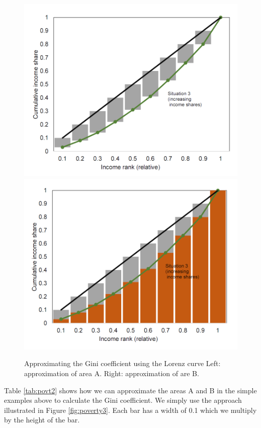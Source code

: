 \documentclass[]{book}
\begin{document}
\begin{figure}

{\centering \includegraphics[width=0.48\linewidth]{_resources/chapter_inequality/ex6_4} \includegraphics[width=0.48\linewidth]{_resources/chapter_inequality/ex6_5} 

}

\caption{Approximating the Gini coefficient using the Lorenz curve Left: approximation of area A. Right: approximation of are B.}\label{fig:poverty2}
\end{figure}

Table \ref{tab:povt2} shows how we can approximate the areas A and B in the simple examples above to calculate the Gini coefficient. We simply use the approach illustrated in Figure \ref{fig:poverty3}. Each bar has a width of 0.1 which we multiply by the height of the bar.
\end{document}

